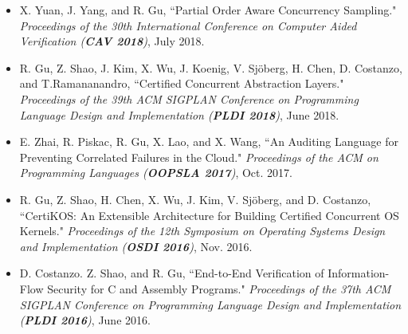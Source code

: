 \documentclass[10pt]{article}
\newenvironment{innerlist}[1][\enskip\textbullet]%
        {\begin{itemize}[#1,leftmargin=25pt,parsep=0pt,itemsep=2pt,topsep=2pt,partopsep=0pt]}
        {\end{itemize}}
\begin{document}
\begin{innerlist}
\vspace{.1in}







\item[] X. Yuan, J. Yang, and R. Gu, ``Partial Order Aware Concurrency Sampling."  \emph{Proceedings of the 30th International Conference on Computer Aided Verification (\textbf{CAV 2018})}, July 2018.

%

\vspace{.1in}

\item[] R. Gu, Z. Shao, J. Kim, X. Wu, J. Koenig, V. Sj\"{o}berg, H. Chen, D. Costanzo, and T.Ramananandro, ``Certified Concurrent Abstraction Layers." \emph{Proceedings of the 39th ACM SIGPLAN Conference on Programming Language Design and Implementation (\textbf{PLDI 2018})}, June 2018.

\vspace{.1in}

\item[] E. Zhai, R. Piskac, R. Gu, X. Lao, and X. Wang, ``An Auditing Language for Preventing Correlated Failures in the Cloud." \emph{Proceedings of the ACM on Programming Languages (\textbf{OOPSLA 2017})}, Oct. 2017.


\vspace{.1in}


\item[] R. Gu, Z. Shao, H. Chen, X. Wu, J. Kim, V. Sj\"{o}berg, and D. Costanzo, ``CertiKOS: An Extensible Architecture for Building Certified Concurrent OS Kernels." \emph{Proceedings of the 12th Symposium on Operating Systems Design and Implementation (\textbf{OSDI 2016})}, Nov. 2016.

\vspace{.1in}

\item[] D. Costanzo. Z. Shao, and R. Gu, ``End-to-End Verification of Information-Flow Security for C and Assembly Programs." \emph{Proceedings of the 37th ACM SIGPLAN Conference on Programming Language Design and Implementation (\textbf{PLDI 2016})}, June 2016.


\end{innerlist}
\end{document}
